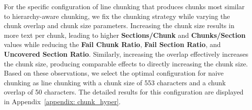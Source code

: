 \begin{table}[!ht]
\centering

\caption{Information loss comparison between hierarchy-aware chunking compared to other naive chunking strategies. Since hierarchy-aware chunking consistently parses into a single law section, it was treated as an upper bound because no information loss occurred.}
\label{table: chunking_by_type}
\end{table}

For the specific configuration of line chunking that produces chunks most similar to hierarchy-aware chunking, we fix the chunking strategy while varying the chunk overlap and chunk size parameters. 
%
Increasing the chunk size results in more text per chunk, leading to higher \textbf{Sections/Chunk} and \textbf{Chunks/Section} values while reducing the \textbf{Fail Chunk Ratio}, \textbf{Fail Section Ratio}, and \textbf{Uncovered Section Ratio}. 
%
Similarly, increasing the overlap effectively increases the chunk size, producing comparable effects to directly increasing the chunk size.
%
Based on these observations, we select the optimal configuration for naive chunking as line chunking with a chunk size of 553 characters and a chunk overlap of 50 characters. The detailed results for this configuration are displayed in Appendix~\ref{appendix: chunk_hyper}.

